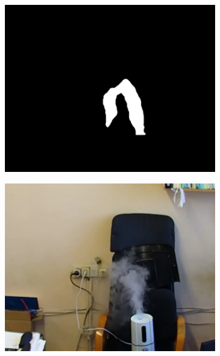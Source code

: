 \documentclass[14pt, a4paper]{extreport}
\begin{document}
\begin{figure}[h!]
\begin{subfigure}{.32\textwidth}
			\centering
			\includegraphics[width = \textwidth]{image/chapter_3/examples/mask_razmet/151}
		\end{subfigure}
		\begin{subfigure}{.32\textwidth}
			\centering
			\includegraphics[width = \textwidth]{image/chapter_3/examples/img/185}
		\end{subfigure}
		\begin{subfigure}{.32\textwidth}
			\centering

\end{subfigure}
\end{figure}
\end{document}
